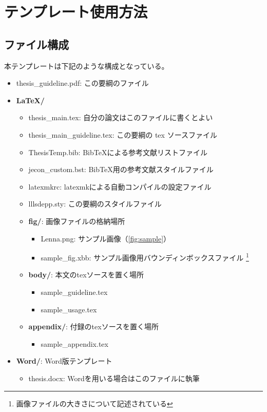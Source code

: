 
\chapter{テンプレート使用方法}
	\label{chp:readme}

	\section{ファイル構成}
		\label{sec:contents}

		本テンプレートは下記のような構成となっている。

		\begin{itemize}
			\ttfamily
			\item thesis\_guideline.pdf: この要綱のファイル
			\item \textbf{LaTeX/}
			\begin{itemize}
				\item thesis\_main.tex: 自分の論文はこのファイルに書くとよい
				\item thesis\_main\_guideline.tex: この要綱の tex ソースファイル
				\item ThesisTemp.bib: BibTeXによる参考文献リストファイル
				\item jecon\_custom.bst: BibTeX用の参考文献スタイルファイル
				\item latexmkrc: latexmkによる自動コンパイルの設定ファイル
				\item lllsdepp.sty: この要綱のスタイルファイル
				\item \textbf{fig/}: 画像ファイルの格納場所
					\begin{itemize}
						\item Lenna.png: サンプル画像（\cref{fig:sample}）
						\item sample\_fig.xbb: サンプル画像用バウンディンボックスファイル
							\footnote{画像ファイルの大きさについて記述されている}
					\end{itemize}
				\item \textbf{body/}: 本文のtexソースを置く場所
					\begin{itemize}
						\item sample\_guideline.tex
						\item sample\_usage.tex
					\end{itemize}
				\item \textbf{appendix/}: 付録のtexソースを置く場所
					\begin{itemize}
						\item sample\_appendix.tex
					\end{itemize}
			\end{itemize}
			\item \textbf{Word/}: Word版テンプレート
				\begin{itemize}
					\item thesis.docx: Wordを用いる場合はこのファイルに執筆
				\end{itemize}
		\end{itemize}

